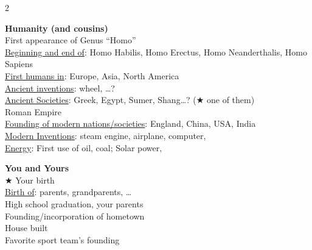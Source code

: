 \documentclass[12pt]{article}
\begin{document}
\begin{multicols}{2}
\begin{tcolorbox}[colback=white,colframe=black,boxrule=0.5pt,arc=2mm,
  left=4pt,right=4pt,top=6pt,bottom=6pt,height=11cm,valign=center]
\vspace{4cm}



\end{tcolorbox}
\vspace{6pt}

\begin{tcolorbox}[colback=white,colframe=black,boxrule=0.5pt,arc=2mm,
  left=4pt,right=4pt,top=6pt,bottom=6pt,height=11cm,valign=center]
\textbf{Humanity (and cousins)}\\[4pt]
First appearance of Genus ``Homo''\\
\underline{Beginning and end of}: Homo Habilis, Homo Erectus, Homo Neanderthalis, Homo Sapiens\\
\underline{First humans in}: Europe, Asia, North America\\
\underline{Ancient inventions}: wheel, \ldots?\\
\underline{Ancient Societies}: Greek, Egypt, Sumer, Shang\ldots? ($\bigstar$ one of them)\\
Roman Empire\\
\underline{Founding of modern nations/societies}: England, China, USA, India\\
\underline{Modern Inventions}: steam engine, airplane, computer, \\
\underline{Energy}: First use of oil, coal; Solar power, \\


\vspace{3cm}


\end{tcolorbox}
\vspace{6pt}
\begin{tcolorbox}[colback=white,colframe=black,boxrule=0.5pt,arc=2mm,
  left=4pt,right=4pt,top=6pt,bottom=6pt,height=11cm,valign=center]
\textbf{You and Yours}\\[4pt]
$\bigstar$ Your birth\\
\underline{Birth of}: parents, grandparents, \ldots\\
High school graduation, your parents\\
Founding/incorporation of hometown\\
House built\\
Favorite sport team's founding\\



\vspace{6cm}



\end{tcolorbox}


\end{multicols}
\end{document}
